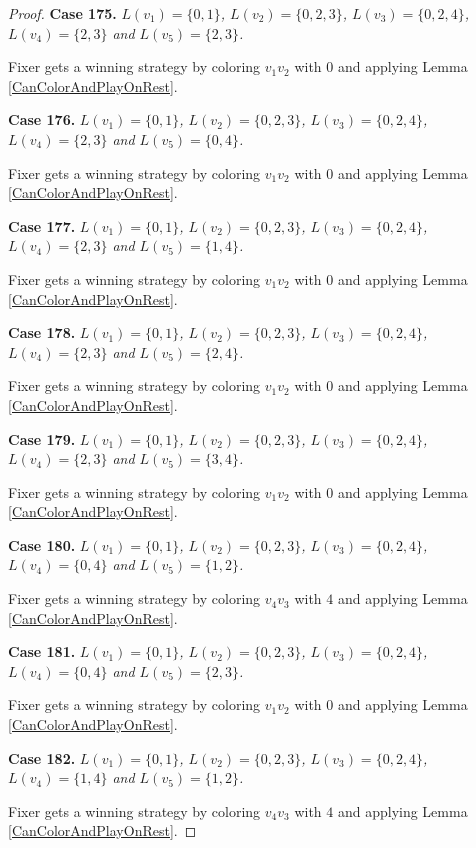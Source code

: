 \documentclass[12pt]{amsart}
\theoremstyle{plain}
\theoremstyle{definition}
\theoremstyle{remark}
\begin{document}
\begin{proof}
\noindent\textbf{Case 175.  }\textit{$L(v_1) = \{0, 1\}$, $L(v_2) = \{0, 2, 3\}$, $L(v_3) = \{0, 2, 4\}$, $L(v_4) = \{2, 3\}$ and $L(v_5) = \{2, 3\}$.}

Fixer gets a winning strategy by coloring $v_1v_2$ with $0$ and applying Lemma \ref{CanColorAndPlayOnRest}.

\noindent\textbf{Case 176.  }\textit{$L(v_1) = \{0, 1\}$, $L(v_2) = \{0, 2, 3\}$, $L(v_3) = \{0, 2, 4\}$, $L(v_4) = \{2, 3\}$ and $L(v_5) = \{0, 4\}$.}

Fixer gets a winning strategy by coloring $v_1v_2$ with $0$ and applying Lemma \ref{CanColorAndPlayOnRest}.

\noindent\textbf{Case 177.  }\textit{$L(v_1) = \{0, 1\}$, $L(v_2) = \{0, 2, 3\}$, $L(v_3) = \{0, 2, 4\}$, $L(v_4) = \{2, 3\}$ and $L(v_5) = \{1, 4\}$.}

Fixer gets a winning strategy by coloring $v_1v_2$ with $0$ and applying Lemma \ref{CanColorAndPlayOnRest}.

\noindent\textbf{Case 178.  }\textit{$L(v_1) = \{0, 1\}$, $L(v_2) = \{0, 2, 3\}$, $L(v_3) = \{0, 2, 4\}$, $L(v_4) = \{2, 3\}$ and $L(v_5) = \{2, 4\}$.}

Fixer gets a winning strategy by coloring $v_1v_2$ with $0$ and applying Lemma \ref{CanColorAndPlayOnRest}.

\noindent\textbf{Case 179.  }\textit{$L(v_1) = \{0, 1\}$, $L(v_2) = \{0, 2, 3\}$, $L(v_3) = \{0, 2, 4\}$, $L(v_4) = \{2, 3\}$ and $L(v_5) = \{3, 4\}$.}

Fixer gets a winning strategy by coloring $v_1v_2$ with $0$ and applying Lemma \ref{CanColorAndPlayOnRest}.

\noindent\textbf{Case 180.  }\textit{$L(v_1) = \{0, 1\}$, $L(v_2) = \{0, 2, 3\}$, $L(v_3) = \{0, 2, 4\}$, $L(v_4) = \{0, 4\}$ and $L(v_5) = \{1, 2\}$.}

Fixer gets a winning strategy by coloring $v_4v_3$ with $4$ and applying Lemma \ref{CanColorAndPlayOnRest}.

\noindent\textbf{Case 181.  }\textit{$L(v_1) = \{0, 1\}$, $L(v_2) = \{0, 2, 3\}$, $L(v_3) = \{0, 2, 4\}$, $L(v_4) = \{0, 4\}$ and $L(v_5) = \{2, 3\}$.}

Fixer gets a winning strategy by coloring $v_1v_2$ with $0$ and applying Lemma \ref{CanColorAndPlayOnRest}.

\noindent\textbf{Case 182.  }\textit{$L(v_1) = \{0, 1\}$, $L(v_2) = \{0, 2, 3\}$, $L(v_3) = \{0, 2, 4\}$, $L(v_4) = \{1, 4\}$ and $L(v_5) = \{1, 2\}$.}

Fixer gets a winning strategy by coloring $v_4v_3$ with $4$ and applying Lemma \ref{CanColorAndPlayOnRest}.


\end{proof}
\end{document}
